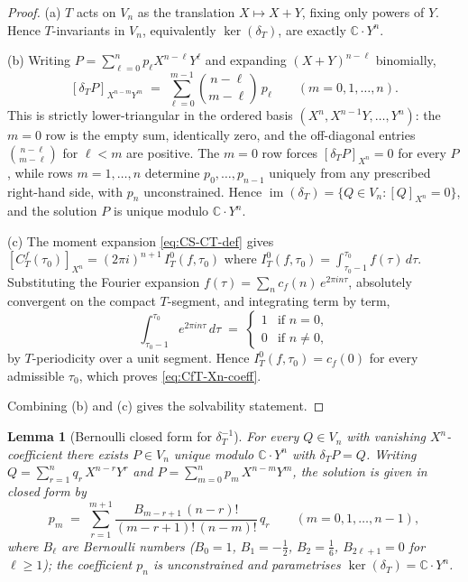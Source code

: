 \documentclass[11pt]{article}
\newtheorem{lemma}[theorem]{Lemma}
\numberwithin{equation}{section}  %
\newcommand{\CC}{\mathbb{C}}
\begin{document}
\begin{proof}
(a) $T$ acts on $V_n$ as the translation $X \mapsto X + Y$, fixing only
powers of $Y$.  Hence $T$-invariants in $V_n$, equivalently
$\ker(\delta_T)$, are exactly $\CC \cdot Y^n$.

(b) Writing $P = \sum_{\ell = 0}^{n} p_\ell X^{n - \ell} Y^\ell$ and expanding
$(X + Y)^{n - \ell}$ binomially,
\begin{equation}\label{eq:delta-T-matrix}
  [\delta_T P]_{X^{n - m} Y^m}
  \;=\; \sum_{\ell = 0}^{m - 1}\!\binom{n - \ell}{m - \ell}\,p_\ell
  \qquad (m = 0, 1, \ldots, n).
\end{equation}
This is strictly lower-triangular in the ordered basis
$(X^n, X^{n - 1}Y, \ldots, Y^n)$: the $m = 0$ row is the empty sum,
identically zero, and the off-diagonal entries
$\binom{n - \ell}{m - \ell}$ for $\ell < m$ are positive.  The $m = 0$ row
forces $[\delta_T P]_{X^n} = 0$ for every $P$, while rows
$m = 1, \ldots, n$ determine $p_0, \ldots, p_{n - 1}$ uniquely from any
prescribed right-hand side, with $p_n$ unconstrained.  Hence
$\operatorname{im}(\delta_T) = \{Q \in V_n : [Q]_{X^n} = 0\}$, and the
solution $P$ is unique modulo $\CC \cdot Y^n$.

(c) The moment expansion \eqref{eq:CS-CT-def} gives
$[C^f_T(\tau_0)]_{X^n} = (2\pi i)^{n+1}\,I^0_T(f, \tau_0)$ where
$I^0_T(f, \tau_0) = \int_{\tau_0 - 1}^{\tau_0}\!f(\tau)\,d\tau$.
Substituting the Fourier expansion $f(\tau) = \sum_n c_f(n)\,
e^{2\pi i n \tau}$, absolutely convergent on the compact $T$-segment,
and integrating term by term,
\begin{equation}
  \int_{\tau_0 - 1}^{\tau_0}\!e^{2\pi i n \tau}\,d\tau
  \;=\; \begin{cases} 1 & \text{if } n = 0,\\
                       0 & \text{if } n \ne 0,
        \end{cases}
\end{equation}
by $T$-periodicity over a unit segment.  Hence $I^0_T(f, \tau_0) = c_f(0)$
for every admissible $\tau_0$, which proves \eqref{eq:CfT-Xn-coeff}.

Combining (b) and (c) gives the solvability statement.
\end{proof}

\begin{lemma}[Bernoulli closed form for $\delta_T^{-1}$]\label{lem:Bernoulli-inv}
For every $Q \in V_n$ with vanishing $X^n$-coefficient there exists
$P \in V_n$ unique modulo $\CC \cdot Y^n$ with $\delta_T P = Q$.
Writing $Q = \sum_{r = 1}^{n} q_r\,X^{n - r} Y^r$ and
$P = \sum_{m = 0}^{n} p_m\,X^{n - m} Y^m$, the solution is given in
closed form by
\begin{equation}\label{eq:Bernoulli-inv}
  p_m \;=\; \sum_{r = 1}^{m + 1}\!\frac{B_{m - r + 1}\,(n - r)!}{(m - r + 1)!\,(n - m)!}\,q_r
  \qquad (m = 0, 1, \ldots, n - 1),
\end{equation}
where $B_\ell$ are Bernoulli numbers ($B_0 = 1$, $B_1 = -\tfrac{1}{2}$,
$B_2 = \tfrac{1}{6}$, $B_{2\ell + 1} = 0$ for $\ell \ge 1$); the
coefficient $p_n$ is unconstrained and parametrises
$\ker(\delta_T) = \CC \cdot Y^n$.
\end{lemma}
\end{document}
